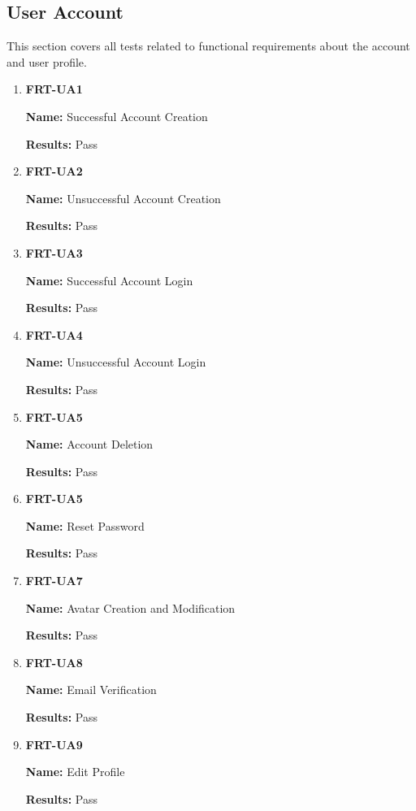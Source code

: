 \documentclass[12pt, titlepage]{article}
\begin{document}
\subsection{User Account}
This section covers all tests related to functional requirements about the account and user profile.
\begin{enumerate}
\item \textbf{FRT-UA1}

\textbf{Name:} Successful Account Creation

\textbf{Results:} Pass

\item \textbf{FRT-UA2}

\textbf{Name:} Unsuccessful Account Creation

\textbf{Results:} Pass

\item \textbf{FRT-UA3}

\textbf{Name:} Successful Account Login

\textbf{Results:} Pass

\item \textbf{FRT-UA4}

\textbf{Name:} Unsuccessful Account Login

\textbf{Results:} Pass

\item \textbf{FRT-UA5}

\textbf{Name:} Account Deletion

\textbf{Results:} Pass

\item \textbf{FRT-UA5}

\textbf{Name:} Reset Password

\textbf{Results:} Pass

\item \textbf{FRT-UA7}

\textbf{Name:} Avatar Creation and Modification

\textbf{Results:} Pass

\item \textbf{FRT-UA8}

\textbf{Name:} Email Verification

\textbf{Results:} Pass

\item \textbf{FRT-UA9}

\textbf{Name:} Edit Profile

\textbf{Results:} Pass
\end{enumerate}
\end{document}
